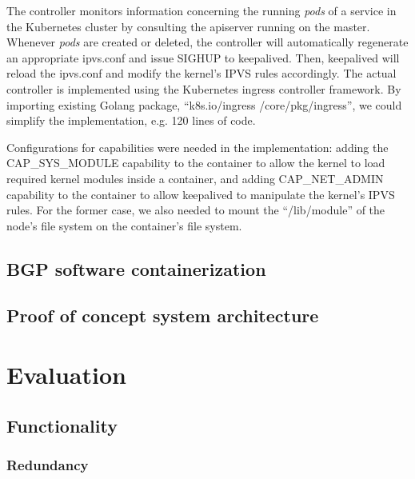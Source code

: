 The controller monitors information concerning the running {\em pods} of a service 
in the Kubernetes cluster by consulting the apiserver running on the master.
Whenever {\em pods} are created or deleted, the controller will automatically regenerate an appropriate ipvs.conf 
and issue SIGHUP to keepalived.
Then, keepalived will reload the ipvs.conf and modify the kernel's IPVS rules accordingly.
The actual controller\cite{ktaka_ccmp_2017_826894} is implemented using the Kubernetes ingress controller\cite{K8sIngress2017} framework. 
By importing existing Golang package, \enquote{k8s.io/ingress /core/pkg/ingress}, we could simplify the implementation, e.g. 
120 lines of code.  


Configurations for capabilities were needed in the implementation: adding the CAP\_SYS\_MODULE capability 
to the container to allow the kernel to load required kernel modules inside a container, 
and adding CAP\_NET\_ADMIN capability to the container to allow keepalived to manipulate the kernel's IPVS rules. 
For the former case, we also needed to mount the \enquote{/lib/module} of the node's file system on the container's file system.

\subsection{BGP software containerization}




\subsection{Proof of concept system architecture}


\section{Evaluation}\label{Evaluation}

\subsection{Functionality}\label{Functionality}

\subsubsection{Redundancy}

